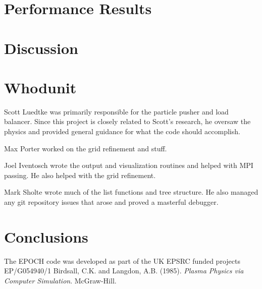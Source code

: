 \documentclass[]{article}
\begin{document}
\section{Performance Results}

\section{Discussion}

\section{Whodunit}
Scott Luedtke was primarily responsible for the particle pusher and load balancer.  Since this project is closely related to Scott's research, he oversaw the physics and provided general guidance for what the code should accomplish.

Max Porter worked on the grid refinement and stuff.

Joel Iventosch wrote the output and visualization routines and helped with MPI passing.  He also helped with the grid refinement.

Mark Sholte wrote much of the list functions and tree structure.  He also managed any git repository issues that arose and proved a masterful debugger.

\section{Conclusions}
























{\def\section*#1{}
\begin{thebibliography}{1}
\setlength{\itemsep}{0pt}
The EPOCH code was developed as part of the UK EPSRC funded projects EP/G054940/1
Birdsall, C.K. and Langdon, A.B.  (1985). \textit{Plasma Physics via Computer Simulation}. McGraw-Hill.

\end{thebibliography}
}
\end{document}
